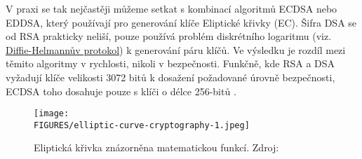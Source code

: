 V praxi se tak nejčastěji můžeme setkat s kombinací algoritmů ECDSA nebo EDDSA, který používají pro generování klíče Eliptické křivky (EC). Šifra DSA se od RSA prakticky neliší, pouze používá problém diskrétního logaritmu (viz. \hyperref[sec:diffie-hellman]{Diffie-Helmannův protokol}) k generování páru klíčů. Ve výsledku je rozdíl mezi těmito algoritmy v rychlosti, nikoli v bezpečnosti. Funkčně, kde RSA a DSA vyžadují klíče velikosti 3072 bitů k dosažení požadované úrovně bezpečnosti, ECDSA toho dosahuje pouze s klíči o délce 256-bitů \parencite{kontsevoy2020}.

\begin{figure}[htbp]
    \centering
    \texttt{[image: \\FIGURES/elliptic-curve-cryptography-1.jpeg]}
    \caption{Eliptická křivka znázorněna matematickou funkcí. Zdroj: \parencite{eliptic-curve-1}}
    \label{fig:elliptic-curve-cryptography}
  \end{figure}
\newpage